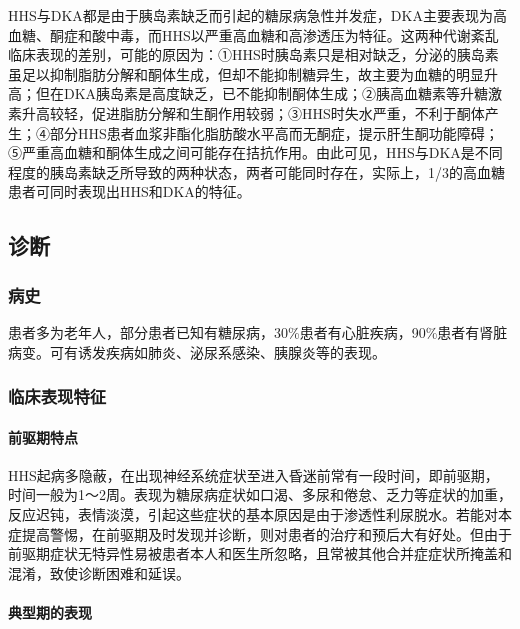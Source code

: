 HHS与DKA都是由于胰岛素缺乏而引起的糖尿病急性并发症，DKA主要表现为高血糖、酮症和酸中毒，而HHS以严重高血糖和高渗透压为特征。这两种代谢紊乱临床表现的差别，可能的原因为：①HHS时胰岛素只是相对缺乏，分泌的胰岛素虽足以抑制脂肪分解和酮体生成，但却不能抑制糖异生，故主要为血糖的明显升高；但在DKA胰岛素是高度缺乏，已不能抑制酮体生成；②胰高血糖素等升糖激素升高较轻，促进脂肪分解和生酮作用较弱；③HHS时失水严重，不利于酮体产生；④部分HHS患者血浆非酯化脂肪酸水平高而无酮症，提示肝生酮功能障碍；⑤严重高血糖和酮体生成之间可能存在拮抗作用。由此可见，HHS与DKA是不同程度的胰岛素缺乏所导致的两种状态，两者可能同时存在，实际上，1/3的高血糖患者可同时表现出HHS和DKA的特征。

\subsection{诊断}

\subsubsection{病史}

患者多为老年人，部分患者已知有糖尿病，30\%患者有心脏疾病，90\%患者有肾脏病变。可有诱发疾病如肺炎、泌尿系感染、胰腺炎等的表现。

\subsubsection{临床表现特征}

\paragraph{前驱期特点}

HHS起病多隐蔽，在出现神经系统症状至进入昏迷前常有一段时间，即前驱期，时间一般为1～2周。表现为糖尿病症状如口渴、多尿和倦怠、乏力等症状的加重，反应迟钝，表情淡漠，引起这些症状的基本原因是由于渗透性利尿脱水。若能对本症提高警惕，在前驱期及时发现并诊断，则对患者的治疗和预后大有好处。但由于前驱期症状无特异性易被患者本人和医生所忽略，且常被其他合并症症状所掩盖和混淆，致使诊断困难和延误。

\paragraph{典型期的表现}

